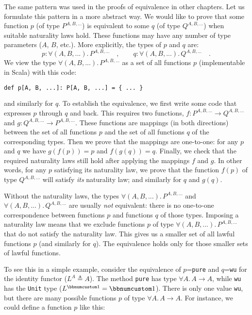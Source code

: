 The same pattern was used in the proofs of equivalence in other chapters.
Let us formulate this pattern in a more abstract way. We would like
to prove that some function $p$ (of type $P^{A,B,...}$) is equivalent
to some $q$ (of type $Q^{A,B,...}$) when suitable naturality laws
hold. These functions may have any number of type parameters ($A$,
$B$, etc.). More explicitly, the types of $p$ and $q$ are:
\[
p:\forall(A,B,...).\,P^{A,B,...}\quad,\quad\quad q:\forall(A,B,...).\,Q^{A,B,...}\quad.
\]
We view the type $\forall(A,B,...).\,P^{A,B,...}$ as a set of all
functions $p$ (implementable in Scala) with this code:
\begin{lstlisting}
def p[A, B, ...]: P[A, B, ...] = { ... }
\end{lstlisting}
and similarly for $q$. To establish the equivalence, we first write
some code that expresses $p$ through $q$ and back. This requires
two functions, $f:P^{A,B,...}\rightarrow Q^{A,B,...}$ and $g:Q^{A,B,...}\rightarrow P^{A,B,...}$.
These functions are mappings (in both directions) between the set
of all functions $p$ and the set of all functions $q$ of the corresponding
types. Then we prove that the mappings are one-to-one: for any $p$
and $q$ we have $g(f(p))=p$ and $f(g(q))=q$. Finally, we check
that the required naturality laws still hold after applying the mappings
$f$ and $g$. In other words, for any $p$ satisfying its naturality
law, we prove that the function $f(p)$ of type $Q^{A,B,...}$ will
satisfy \emph{its} naturality law; and similarly for $q$ and $g(q)$.

Without the naturality laws, the types $\forall(A,B,...).\,P^{A,B,...}$
and $\forall(A,B,...).\,Q^{A,B,...}$ are usually \emph{not} equivalent:
there is no one-to-one correspondence between functions $p$ and functions
$q$ of those types. Imposing a naturality law means that we exclude
functions $p$ of type $\forall(A,B,...).\,P^{A,B,...}$ that do not
satisfy the naturality law. This gives us a smaller set of all lawful
functions $p$ (and similarly for $q$). The equivalence holds only
for those smaller sets of lawful functions.

To see this in a simple example, consider the equivalence of $p$=\lstinline!pure!
and $q$=\lstinline!wu! for the identity functor ($L^{A}\triangleq A$).
The method \lstinline!pure! has type $\forall A.\,A\rightarrow A$,
while \lstinline!wu! has the \lstinline!Unit! type ($L^{\bbnum 1}=\bbnum 1$).
There is only one value \lstinline!wu!, but there are many possible
functions $p$ of type $\forall A.\,A\rightarrow A$. For instance,
we could define a function $p$ like this:

